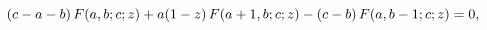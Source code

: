 \[(c-a-b)\mathop{F\/}\nolimits\!\left(a,b;c;z\right)+a(1-z)\mathop{F\/}\nolimits%
\!\left(a+1,b;c;z\right)-(c-b)\mathop{F\/}\nolimits\!\left(a,b-1;c;z\right)=0,\]